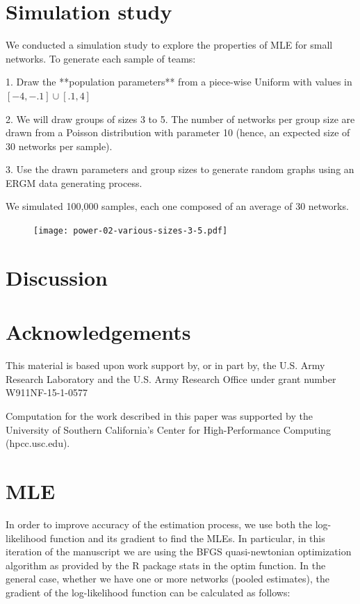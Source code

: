 \documentclass[12pt]{article}
\begin{document}
\section{Simulation study}

We conducted a simulation study to explore the properties of MLE for small networks. To generate each sample of teams:

1. Draw the **population parameters** from a piece-wise Uniform with values in $[-4, -.1]\cup[.1, 4]$

2. We will draw groups of sizes 3 to 5. The number of networks per group size are drawn from a Poisson distribution with parameter 10 (hence, an expected size of 30 networks per sample).

3. Use the drawn parameters and group sizes to generate random graphs using an ERGM data generating process.

We simulated 100,000 samples, each one composed of an average of 30 networks.

\begin{figure}
	\centering
	\texttt{[image: power-02-various-sizes-3-5.pdf]}
\end{figure}

\section{Discussion}

\section{Acknowledgements}

This material is based upon work support by, or in part by, the U.S. Army Research Laboratory and the U.S. Army Research Office under grant number W911NF-15-1-0577

Computation for the work described in this paper was supported by the University of Southern California’s Center for High-Performance Computing (hpcc.usc.edu).




\appendix

\section{MLE}

In order to improve accuracy of the estimation process, we use both the log-likelihood function and its gradient to find the MLEs. In particular, in this iteration of the manuscript we are using the BFGS quasi-newtonian optimization algorithm as provided by the R package stats in the optim function. In the general case, whether we have one or more networks (pooled estimates), the gradient of the log-likelihood function can be calculated as follows:
\end{document}
